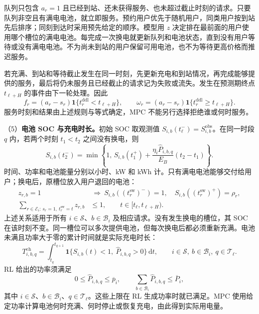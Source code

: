 \documentclass[12pt,a4paper,UTF8]{ctexart}
\begin{document}
队列只包含 $a_r=1$ 且已经到站、还未获得服务、也未超过截止时刻的请求。只要队列非空且有满电电池，就立即服务。预约用户优先于随机用户，同类用户按到站先后排序；同刻到达时采用预先给定的顺序。模型用 $z$ 决定排在最前面的用户使用哪个槽位的满电电池。每完成一次换电就更新队列和电池状态，直到没有用户等待或没有满电电池。不为尚未到站的用户保留可用电池，也不为等待更高价格而推迟服务。

若充满、到站和等待截止发生在同一时刻，先更新充电和到站情况，再完成能够提供的服务，最后将仍未服务且已经截止的请求记为失败或流失。发生在预测期终点 $t_{\ell+H}$ 的事件由下一轮处理。因此
\begin{equation}
f_r=(a_r-s_r)\mathbf1\{t_r^{\mathrm{ddl}}<t_{\ell+H}\},
\qquad
\omega_r=(a_r-s_r)\mathbf1\{t_r^{\mathrm{ddl}}\ge t_{\ell+H}\}.
\label{eq:outcome_boundary}
\end{equation}
服务时刻和结果由上述规则与等式确定，MPC 不能另行选择拒绝谁或何时服务。

（5）\textbf{电池 SOC 与充电时长。}初始 SOC 取观测值 $S_{i,b}(t_\ell^-)=S_{i,b}^{\mathrm{obs}}$。在同一时段 $q$ 内，若两个时刻 $t_1<t_2$ 之间没有换电，则
\begin{equation}
S_{i,b}(t_2^-)=\min\left\{1,\,
S_{i,b}(t_1^+)+\frac{\eta_i\widehat P_{i,b,q}}{E_B}(t_2-t_1)\right\}.
\label{eq:event_charging_transition}
\end{equation}
时间、功率和电池能量分别以小时、kW 和 kWh 计。只有满电电池能够交付给用户；换电后，原槽位放入用户退回的电池：
\begin{equation}
\begin{aligned}
z_{r,b}=1&\ \Longrightarrow\
S_{i,b}((t_r^{\mathrm{sw}})^-)=1,\quad
S_{i,b}((t_r^{\mathrm{sw}})^+)=\rho_r,\\
\sum_{r\in\mathcal E_i:\,s_r=1,\ t_r^{\mathrm{sw}}=t}z_{r,b}&\le1,
\qquad t\in[t_\ell,t_{\ell+H}).
\end{aligned}
\label{eq:slot_matching}
\end{equation}
上述关系适用于所有 $i\in\mathcal S$、$b\in\mathcal B_i$ 及相应请求。没有发生换电的槽位，其 SOC 在该时刻不变。同一槽位可以多次提供电池，但每次换电后都必须重新充满。电池未满且功率大于零的累计时间就是实际充电时长：
\begin{equation}
T_{i,b,q}^{\mathrm{ch}}=\int_{t_q}^{t_{q+1}}
\mathbf1\{S_{i,b}(t)<1,\ \widehat P_{i,b,q}>0\}\,\mathrm dt,
\qquad i\in\mathcal S,\ b\in\mathcal B_i,\ q\in\mathcal T_\ell.
\label{eq:charging_duration}
\end{equation}
RL 给出的功率须满足
\begin{equation}
0\le\widehat P_{i,b,q}\le\overline p_i,
\qquad\sum_{b\in\mathcal B_i}\widehat P_{i,b,q}\le\overline P_i,
\label{eq:power_projection}
\end{equation}
其中 $i\in\mathcal S$、$b\in\mathcal B_i$、$q\in\mathcal T_\ell$。这些上限在 RL 生成功率时就已满足。MPC 使用给定功率计算电池何时充满、何时停止或恢复充电，由此得到实际用电量。
\end{document}

